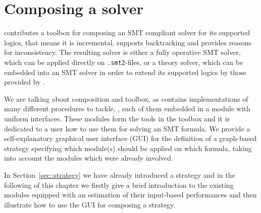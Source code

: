 \chapter{Composing a solver}
\label{chapter:composingats}
\smtrat contributes a toolbox for composing an SMT compliant solver for its supported logics, that means it is incremental, supports backtracking and provides reasons for inconsistency. The resulting
solver is either a fully operative SMT solver, which can be applied
directly on \texttt{.smt2}-files, or a theory solver, which can be embedded into an SMT 
solver in order to extend its supported logics by those provided by \smtrat.

We are talking about composition and toolbox, as \smtrat contains implementations
of many different procedures to tackle, \eg \supportedLogics, each of them
embedded in a module with uniform interfaces. These modules form the tools in the toolbox
and it is dedicated to a user how to use them for solving an SMT formula.
We provide a self-explanatory graphical user interface (GUI) for the definition of a graph-based 
strategy specifying which module(s) should be applied on which formula, 
taking into account the modules which were already involved.

In Section~\ref{sec::strategy} we have already introduced
a strategy and in the following of this chapter we firstly give a brief introduction 
to the existing modules equipped with an estimation of their input-based performances and then illustrate
how to use the GUI for composing a strategy.

